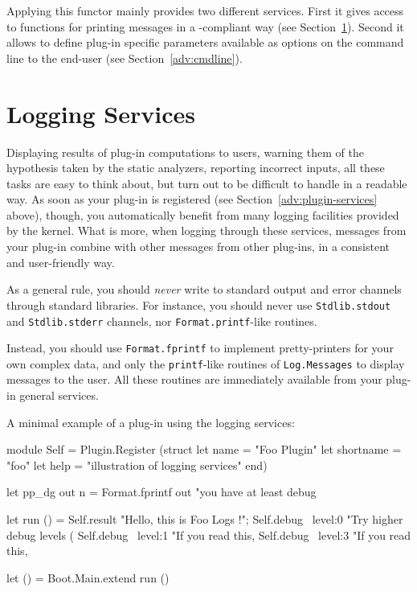 Applying this functor mainly provides two different services. First it gives
access to functions for printing messages in a \framac-compliant way (see
Section~\ref{adv:log}). Second it allows to define plug-in specific parameters
available as options on the \framac command line to the end-user (see
Section~\ref{adv:cmdline}).


\section{Logging Services}\label{adv:log}

Displaying results of plug-in computations to users, warning them of the
hypothesis taken by the static analyzers, reporting incorrect inputs, all
these tasks are easy to think about, but turn out to be difficult to
handle in a readable way. As soon as your plug-in is registered (see
Section~\ref{adv:plugin-services} above), though, you automatically
benefit from many logging facilities provided by the kernel. What is more,
when logging through these services, messages from your plug-in
combine with other messages from other plug-ins, in a consistent
and user-friendly way.

As a general rule, you should \emph{never} write to standard output
and error channels through \ocaml standard libraries. For instance,
you should never use \texttt{Stdlib.stdout} and
\texttt{Stdlib.stderr} channels, nor \texttt{Format.printf}-like
routines.

Instead, you should use \texttt{Format.fprintf} to implement
pretty-printers for your own complex data, and only the
\texttt{printf}-like routines of
\texttt{Log.Messages} to display messages to
the user. All these routines are immediately available from your
plug-in general services.

\begin{example}
A minimal example of a plug-in using the logging services:
\begin{ocamlcode}
module Self = Plugin.Register
  (struct
     let name = "Foo Plugin"
     let shortname = "foo"
     let help = "illustration of logging services"
   end)

let pp_dg out n =
  Format.fprintf out
    "you have at least debug %

let run () =
  Self.result "Hello, this is Foo Logs !";
  Self.debug ~level:0 "Try higher debug levels (%
  Self.debug ~level:1 "If you read this, %
  Self.debug ~level:3 "If you read this, %

let () = Boot.Main.extend run ()
\end{ocamlcode}
\end{example}

